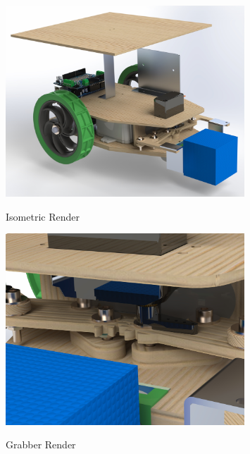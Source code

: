 \documentclass{article}
\begin{document}
\begin{figure}[H]
    \centering
    \includegraphics[width=0.8\textwidth]{assets/isometric.jpg}
    \label{fig:isometric}
    \caption{Isometric Render}
\end{figure}

\begin{figure}[H]
    \centering
    \includegraphics[width=0.8\textwidth]{assets/grabber_render.jpg}
    \label{fig:grabber_render}
    \caption{Grabber Render}
\end{figure}
\end{document}

